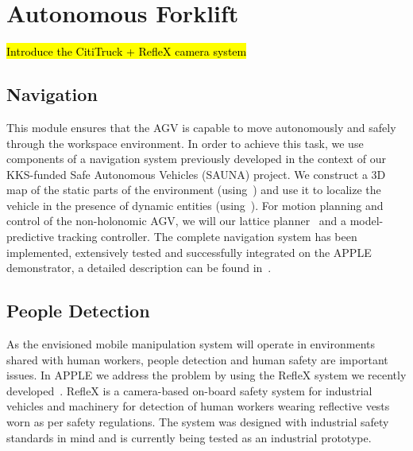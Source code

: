 \section{Autonomous Forklift}
\label{sec:agv}
%
\hl{Introduce the CitiTruck + RefleX camera system}
%
\subsection{Navigation}
\label{subsec:navigation}
%
This module ensures that the AGV is capable to move autonomously and safely through the workspace
environment. In order to achieve this task, we use components of a navigation system previously
developed in the context of our KKS-funded Safe Autonomous Vehicles (SAUNA) project. We construct a
3D map of the static parts of the environment (using~\cite{Stoy13}) and use it to localize the
vehicle in the presence of dynamic entities (using~\cite{Vale14}). For motion planning and control
of the non-holonomic AGV, we will our lattice planner~\cite{Ciri14} and a model-predictive tracking
controller. The complete navigation system has been implemented, extensively tested and successfully
integrated on the APPLE demonstrator, a detailed description can be found in~\cite{Andr15}.
%
\subsection{People Detection}
\label{subsec:people_det}
%
As the envisioned mobile manipulation system will operate in environments shared with human workers,
people detection and human safety are important issues. In APPLE we address the problem by using the
RefleX system we recently developed~\cite{Mosb14}. RefleX is a camera-based on-board safety system
for industrial vehicles and machinery for detection of human workers wearing reflective vests worn
as per safety regulations. The system was designed with industrial safety standards in mind and is
currently being tested as an industrial prototype.
%
